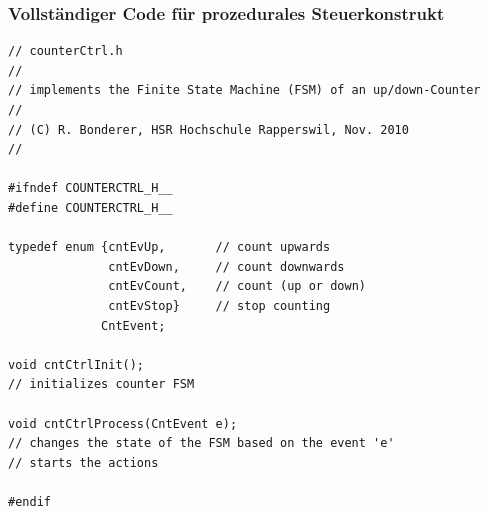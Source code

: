\subsubsection{Vollständiger Code für prozedurales Steuerkonstrukt}
\begin{lstlisting}
// counterCtrl.h
//
// implements the Finite State Machine (FSM) of an up/down-Counter
//
// (C) R. Bonderer, HSR Hochschule Rapperswil, Nov. 2010
//

#ifndef COUNTERCTRL_H__
#define COUNTERCTRL_H__

typedef enum {cntEvUp,       // count upwards
              cntEvDown,     // count downwards
              cntEvCount,    // count (up or down)
              cntEvStop}     // stop counting
             CntEvent;

void cntCtrlInit();
// initializes counter FSM

void cntCtrlProcess(CntEvent e);
// changes the state of the FSM based on the event 'e'
// starts the actions

#endif
\end{lstlisting}
